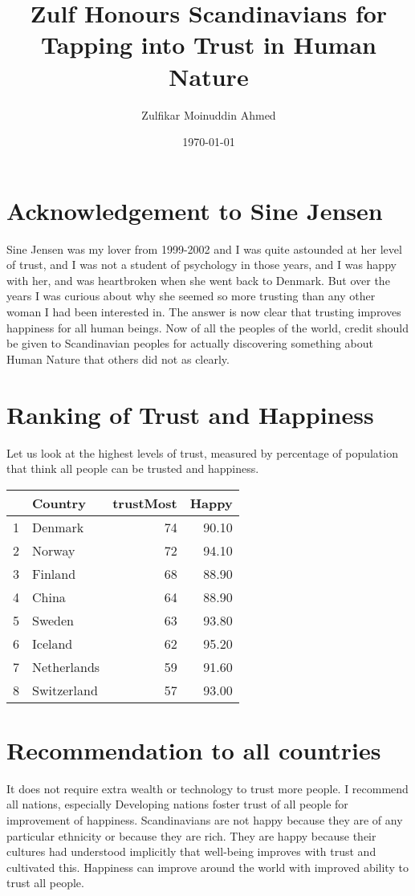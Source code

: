 \documentclass{amsart}
\title{Zulf Honours Scandinavians for Tapping into Trust in Human Nature}
\author{Zulfikar Moinuddin Ahmed}
\date{\today}
\begin{document}
\maketitle
\section{Acknowledgement to Sine Jensen}
Sine Jensen was my lover from 1999-2002 and I was quite astounded at her level of trust, and I was not a student of psychology in those years, and I was happy with her, and was heartbroken when she went back to Denmark.  But over the years I was curious about why she seemed so more trusting than any other woman I had been interested in.  The answer is now clear that trusting improves happiness for all human beings.  Now of all the peoples of the world, credit should be given to Scandinavian peoples for actually discovering something about Human Nature that others did not as clearly.

\section{Ranking of Trust and Happiness}

Let us look at the highest levels of trust, measured by percentage of population that think all people can be trusted and happiness.

\begin{table}[ht]
\centering
\begin{tabular}{rlrr}
  \hline
 & Country & trustMost & Happy \\ 
  \hline
1 & Denmark &  74 & 90.10 \\ 
  2 & Norway &  72 & 94.10 \\ 
  3 & Finland &  68 & 88.90 \\ 
  4 & China &  64 & 88.90 \\ 
  5 & Sweden &  63 & 93.80 \\ 
  6 & Iceland &  62 & 95.20 \\ 
  7 & Netherlands &  59 & 91.60 \\ 
  8 & Switzerland &  57 & 93.00 \\ 
   \hline
\end{tabular}
\end{table}

\section{Recommendation to all countries}

It does not require extra wealth or technology to trust more people.  I recommend all nations, especially Developing nations foster trust of all people for improvement of happiness.  Scandinavians are not happy because they are of any particular ethnicity or because they are rich.  They are happy because their cultures had understood implicitly that well-being improves with trust and cultivated this.  Happiness can improve around the world with improved ability to trust all people.
\end{document}
